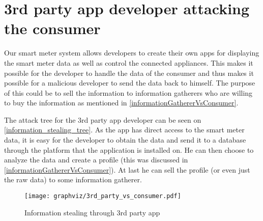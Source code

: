 \section{3rd party app developer attacking the consumer}\label{3rdpartyattacktree}
Our smart meter system allows developers to create their own apps for displaying the smart meter data as well as control the connected appliances.
This makes it possible for the developer to handle the data of the consumer and thus makes it possible for a malicious developer to send the data back to himself.
The purpose of this could be to sell the information to information gatherers who are willing to buy the information as mentioned in \cref{informationGathererVsConsumer}.

The attack tree for the 3rd party app developer can be seen on \cref{information_stealing_tree}.
As the app has direct access to the smart meter data, it is easy for the developer to obtain the data and send it to a database through the platform that the application is installed on.
He can then choose to analyze the data and create a profile (this was discussed in \cref{informationGathererVsConsumer}).
At last he can sell the profile (or even just the raw data) to some information gatherer.

\begin{figure}
  \begin{center}
    \texttt{[image: graphviz/3rd\_party\_vs\_consumer.pdf]}
  \end{center}
  \caption{Information stealing through 3rd party app}
  \label{3rdpartyTree}
\end{figure}